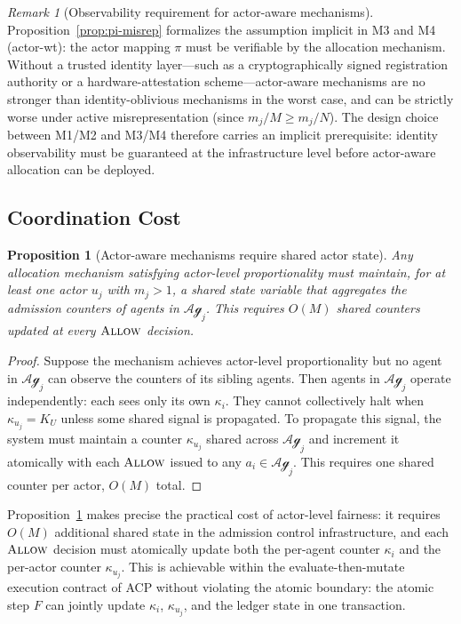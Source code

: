 \documentclass[11pt]{article}
\theoremstyle{plain}
\newtheorem{proposition}[theorem]{Proposition}
\theoremstyle{definition}
\theoremstyle{remark}
\newtheorem{remark}[theorem]{Remark}
\newcommand{\Allow}{\textsc{Allow}}
\newcommand{\Agents}{\mathcal{Ag}}         %
\newcommand{\owner}{\pi}                   %
\begin{document}
\begin{remark}[Observability requirement for actor-aware mechanisms]
\label{rem:pi-obs}
Proposition~\ref{prop:pi-misrep} formalizes the assumption implicit
in M3 and M4 (actor-wt): the actor mapping $\owner$ must be verifiable
by the allocation mechanism.  Without a trusted identity layer---such
as a cryptographically signed registration authority or a
hardware-attestation scheme---actor-aware mechanisms are no stronger
than identity-oblivious mechanisms in the worst case, and can be
strictly worse under active misrepresentation (since $m_j/M \geq m_j/N$).
The design choice between M1/M2 and M3/M4 therefore carries an
implicit prerequisite: identity observability must be guaranteed at
the infrastructure level before actor-aware allocation can be deployed.
\end{remark}

\subsection{Coordination Cost}

\begin{proposition}[Actor-aware mechanisms require shared actor state]
\label{prop:cost}
Any allocation mechanism satisfying actor-level proportionality must
maintain, for at least one actor $u_j$ with $m_j > 1$, a shared state
variable that aggregates the admission counters of agents in $\Agents_j$.
This requires $O(M)$ shared counters updated at every $\Allow$ decision.
\end{proposition}

\begin{proof}
Suppose the mechanism achieves actor-level proportionality but no agent
in $\Agents_j$ can observe the counters of its sibling agents.  Then
agents in $\Agents_j$ operate independently: each sees only its own
$\kappa_i$.  They cannot collectively halt when $\kappa_{u_j} = K_U$
unless some shared signal is propagated.  To propagate this signal, the
system must maintain a counter $\kappa_{u_j}$ shared across $\Agents_j$
and increment it atomically with each $\Allow$ issued to any $a_i \in
\Agents_j$.  This requires one shared counter per actor, $O(M)$ total.
\end{proof}

Proposition~\ref{prop:cost} makes precise the practical cost of
actor-level fairness: it requires $O(M)$ additional shared state in
the admission control infrastructure, and each $\Allow$ decision must
atomically update both the per-agent counter $\kappa_i$ and the
per-actor counter $\kappa_{u_j}$.  This is achievable within the
evaluate-then-mutate execution contract of ACP without violating the
atomic boundary: the atomic step $F$ can jointly update $\kappa_i$,
$\kappa_{u_j}$, and the ledger state in one transaction.
\end{document}
